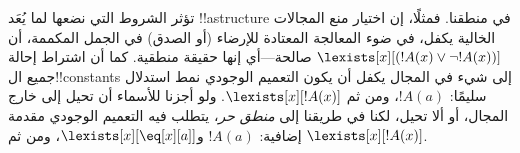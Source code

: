 \documentclass[../../../include/open-logic-section]{subfiles}
\begin{document}
\begin{digress}
تؤثر الشروط التي نضعها لما يُعَد !!a{structure} في منطقنا. فمثلًا،
إن اختيار منع المجالات الخالية يكفل، في ضوء المعالجة المعتادة
للإرضاء (أو الصدق) في الجمل المكممة، أن
$\lexists[x][(!A(x) \lor \lnot !A(x))]$ صالحة---أي إنها حقيقة
منطقية. كما أن اشتراط إحالة جميع ال!!{constant}s إلى شيء في المجال
يكفل أن يكون التعميم الوجودي نمط استدلال سليمًا: $!A(a)$، ومن ثم
$\lexists[x][!A(x)]$. ولو أجزنا للأسماء أن تحيل إلى خارج المجال، أو
ألا تحيل، لكنا في طريقنا إلى \emph{منطق حر}، يتطلب فيه التعميم
الوجودي مقدمة إضافية: $!A(a)$ و$\lexists[x][\eq[x][a]]$، ومن ثم
$\lexists[x][!A(x)]$.
\end{digress}
\end{document}
